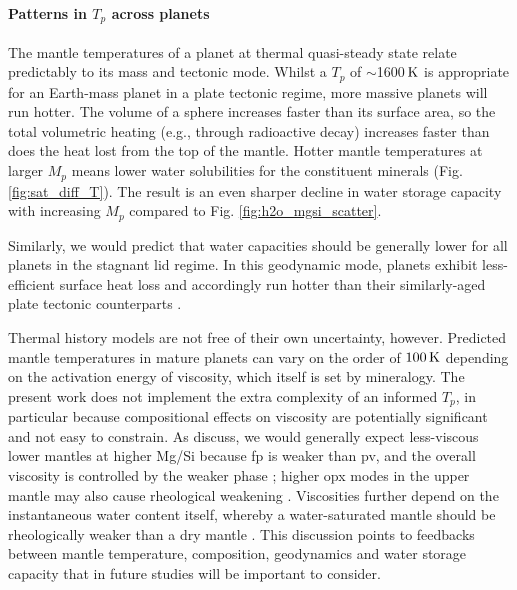 \paragraph{Patterns in $T_p$ across planets}

The mantle temperatures of a planet at thermal quasi-steady state relate predictably to its mass and tectonic mode. Whilst a $T_p$ of $\sim$1600$\,{\rm K}$ is appropriate for an Earth-mass planet in a plate tectonic regime, more massive planets will run hotter.
The volume of a sphere increases faster than its surface area, so the total volumetric heating (e.g., through radioactive decay) increases faster than does the heat lost from the top of the mantle. %
Hotter mantle temperatures at larger $M_p$ means lower water solubilities for the constituent minerals (Fig. \ref{fig:sat_diff_T}). The result is an even sharper decline in water storage capacity with increasing $M_p$ compared to Fig. \ref{fig:h2o_mgsi_scatter}.

Similarly, we would predict that water capacities should be generally lower for all planets in the stagnant lid regime. In this geodynamic mode, planets exhibit less-efficient surface heat loss and accordingly run hotter than their similarly-aged plate tectonic counterparts \citep[e.g.,][]{kite2009geodynamics}. 

Thermal history models are not free of their own uncertainty, however. Predicted mantle temperatures in mature planets can vary on the order of $100\,{\rm K}$ depending on the activation energy of viscosity, which itself is set by mineralogy. The present work does not implement the extra complexity of an informed $T_p$, in particular because compositional effects on viscosity are potentially significant and not easy to constrain. As \citet{spaargaren_influence_2020} discuss, we would generally expect less-viscous lower mantles at higher Mg/Si because fp is weaker than pv, and the overall viscosity is controlled by the weaker phase \citep{girard_shear_2016}; higher opx modes in the upper mantle may also cause rheological weakening \citep{tasaka_rheological_2020}. Viscosities further depend on the instantaneous water content itself, whereby a water-saturated mantle should be rheologically weaker than a dry mantle \citep{karato_rheology_1993}. This discussion points to feedbacks between mantle temperature, composition, geodynamics and water storage capacity that in future studies will be important to consider.

